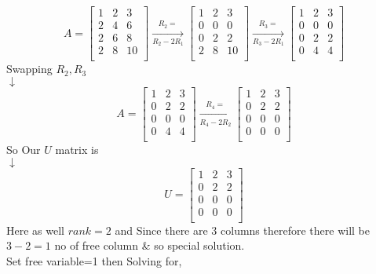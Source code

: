 \documentclass[a4paper,11pt]{article}
\numberwithin{equation}{section}
\begin{document}
\begin{itemize}
\begin{center}
    \[A=
        \begin{bmatrix}
            1&2&3\\2&4&6\\2&6&8\\2&8&10\\
        \end{bmatrix} \xrightarrow[R_2-2R_1]{R_2=}
        \begin{bmatrix}
            1&2&3\\0&0&0\\0&2&2\\2&8&10\\
        \end{bmatrix} \xrightarrow[R_3-2R_1]{R_3=}
        \begin{bmatrix}
            1&2&3\\0&0&0\\0&2&2\\0&4&4\\
        \end{bmatrix}
    \]
    Swapping $R_2,R_3$\\
    $\downarrow$ 
    \[A=
        \begin{bmatrix}
            1&2&3\\0&2&2\\0&0&0\\0&4&4\\
        \end{bmatrix}\xrightarrow[R_4-2R_2]{R_4=}
        \begin{bmatrix}
            1&2&3\\0&2&2\\0&0&0\\0&0&0\\
        \end{bmatrix} 
    \]
    So Our $U$ matrix is\\
    $\downarrow$ 
    \[U=
        \begin{bmatrix}
            1&2&3\\0&2&2\\0&0&0\\0&0&0\\
        \end{bmatrix} 
    \]
    Here as well $rank=2$ and Since there are $3$ columns therefore there will be $3-2=1$ no of free column \& so special solution.\\
        \vspace{10pt}
    Set free variable=1 then Solving for,\\

\end{center}
\end{itemize}
\end{document}
